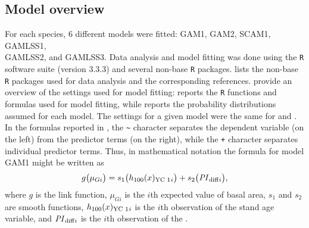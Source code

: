 \subsection{Model overview}

For each species, 6 different models were fitted: GAM1, GAM2, SCAM1, GAMLSS1, \\
GAMLSS2, and GAMLSS3.
Data analysis and model fitting was done using the \texttt{R} software suite (version 3.3.3) \parencite{RCT2017} and several non-base \texttt{R} packages.
 lists the non-base \texttt{R} packages used for data analysis and the corresponding references.
 provide an overview of the settings used for model fitting:   reports the \texttt{R} functions and formulas used for model fitting, while  reports the probability distributions assumed for each model.
The settings for a given model were the same for \Beech{} and \Spruce{}.
In the formulas reported in , the \texttt{\textasciitilde{}} character separates the dependent variable (on the left) from the predictor terms (on the right), while the \texttt{+} character separates individual predictor terms.
Thus, in mathematical notation the formula for model GAM1 might be written as
\begin{equation}
  \label{eq:GAM1FormulaMathematicalNotation}
  g\bigl(\mu_{Gi}\bigr) = s_1\bigl(h_{100}(x)_{\text{YC 1}}{}_i\bigr) + s_2\bigl(\mathit{PI}_{\text{diff}}{}_i\bigr),
\end{equation}
where \(g\) is the link function, \(\mu_{Gi}\) is the \(i\)th expected value of basal area, \(s_1\) and \(s_2\) are smooth functions, \(h_{100}(x)_{\text{YC 1}}{}_i\) is the \(i\)th observation of the stand age variable, and \(\mathit{PI}_{\text{diff}}{}_i\) is the \(i\)th observation of the \ProductivityIndexVariableText{}.
